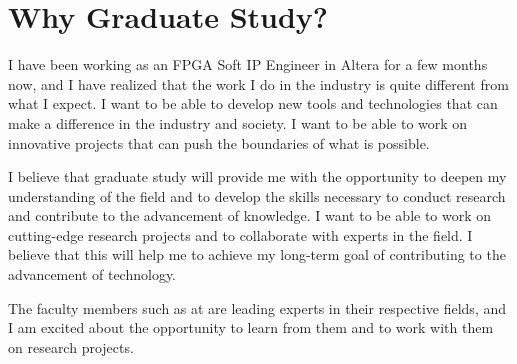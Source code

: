 \documentclass[a4 paper, 10pt]{article}
\begin{document}
\section*{Why Graduate Study?}
I have been working as an {FPGA Soft IP Engineer} in Altera for a few months now, and I have realized that the work I do in the industry is quite different from what I expect. I want to be able to develop {new tools and technologies} that can make a difference in the industry and society. I want to be able to work on {innovative projects} that can push the boundaries of what is possible.

I believe that graduate study will provide me with the opportunity to {deepen my understanding} of the field and to develop the skills necessary to conduct {research} and contribute to the {advancement of knowledge}. I want to be able to work on {cutting-edge research projects} and to collaborate with {experts in the field}. I believe that this will help me to achieve my long-term goal of contributing to the {advancement of technology}.

The faculty members such as \theFacultyMember{} at \theSchoolFullName{} are leading experts in their respective fields, and I am excited about the opportunity to learn from them and to work with them on research projects. 
\end{document}
